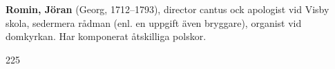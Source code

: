 \textbf{Romin, Jöran} (Georg, 1712--1793), director cantus ock apologist vid Visby skola, sedermera rådman (enl. en uppgift även bryggare), organist vid domkyrkan. Har komponerat åtskilliga polskor.

225 
